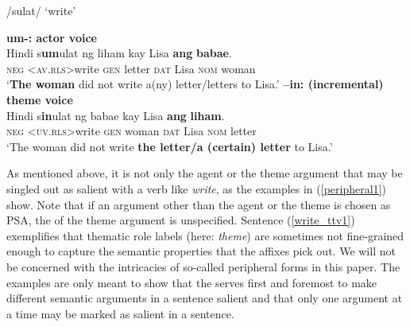 \documentclass[output=paper,
,modfonts
,nonflat]{langsci/langscibook}
\begin{document}
\begin{exe}
\ex\label{write_basic} /sulat/ ‘write’
\begin{xlist}
\ex\label{write_av1} \textbf{um-: actor voice}\\
\gll Hindi s{\USSmaller}\textbf{um}{\USGreater}ulat {{\ob}ng} {liham{\cb}\ug} kay Lisa \textbf{{\ob}ang} \textbf{babae{\cb}\act}.\\
     \textsc{neg}   \textsc{<av.rls>}write \textsc{\void{[}gen} letter  \textsc{dat} Lisa \textsc{\void{[}nom} woman\\ 
\glt `\textbf{The woman} did not write a(ny) letter/letters to Lisa.'
\ex\label{write_tv1} \textbf{–in: (incremental) theme voice}\\
\gll Hindi s{\USSmaller}\textbf{in}{\USGreater}ulat {{\ob}ng} {babae{\cb}\act} kay Lisa \textbf{{\ob}ang} \textbf{liham{\cb}\ug}.\\
 	\textsc{neg}  \textsc{<uv.rls>}write \textsc{\void{[}gen} woman \textsc{dat} Lisa \textsc{\void{[}nom} letter\\
\glt `The woman did not write \textbf{the letter/a (certain) letter} to Lisa.'
\end{xlist}
\end{exe}

\noindent As mentioned above, it is not only the agent or the theme argument that may be singled out as salient with a verb like \textit{write}, as the examples in (\ref{peripheral1}) show. Note that if an argument other than the agent or the theme is chosen as PSA, the  of the theme argument is unspecified. 
Sentence (\ref{write_ttv1}) exemplifies that thematic role labels (here: \textit{theme}) are sometimes not fine-grained enough to capture the semantic properties that the  affixes pick out. We will not be concerned with the intricacies of so-called peripheral  forms in this paper. The examples are only meant to show that the  serves first and foremost to make different semantic arguments in a sentence salient and that only one argument at a time may be marked as salient in a sentence. 
\end{document}
